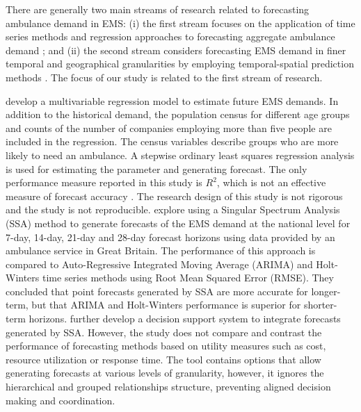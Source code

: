 \documentclass[
  authoryear,
  preprint,
  3p]{elsarticle}
\begin{document}
There are generally two main streams of research related to forecasting
ambulance demand in EMS: (i) the first stream focuses on the application
of time series methods and regression approaches to forecasting
aggregate ambulance demand \citep{vile2012predicting, sasaki2010using};
and (ii) the second stream considers forecasting EMS demand in finer
temporal and geographical granularities by employing temporal-spatial
prediction methods \citep{zhou2016predicting, zhou2016predictinglit}.
The focus of our study is related to the first stream of research.

\citet{sasaki2010using} develop a multivariable regression model to
estimate future EMS demands. In addition to the historical demand, the
population census for different age groups and counts of the number of
companies employing more than five people are included in the
regression. The census variables describe groups who are more likely to
need an ambulance. A stepwise ordinary least squares regression analysis
is used for estimating the parameter and generating forecast. The only
performance measure reported in this study is \(R^2\), which is not an
effective measure of forecast accuracy \citep[p457]{armstrong01}. The
research design of this study is not rigorous and the study is not
reproducible. \citet{vile2012predicting} explore using a Singular
Spectrum Analysis (SSA) method to generate forecasts of the EMS demand
at the national level for 7-day, 14-day, 21-day and 28-day forecast
horizons using data provided by an ambulance service in Great Britain.
The performance of this approach is compared to Auto-Regressive
Integrated Moving Average (ARIMA) and Holt-Winters time series methods
using Root Mean Squared Error (RMSE). They concluded that point
forecasts generated by SSA are more accurate for longer-term, but that
ARIMA and Holt-Winters performance is superior for shorter-term
horizons. \citet{vile2016time} further develop a decision support system
to integrate forecasts generated by SSA. However, the study does not
compare and contrast the performance of forecasting methods based on
utility measures such as cost, resource utilization or response time.
The tool contains options that allow generating forecasts at various
levels of granularity, however, it ignores the hierarchical and grouped
relationships structure, preventing aligned decision making and
coordination.
\end{document}
